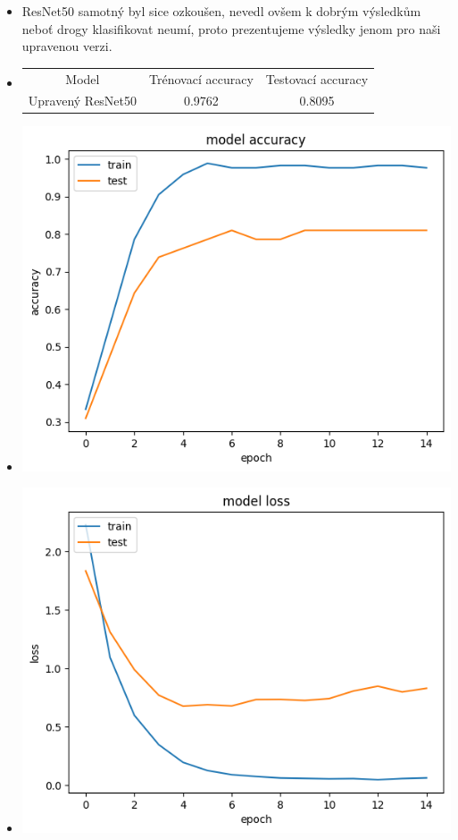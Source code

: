 \documentclass[a4paper]{article}
\newenvironment{ukol}[2][]{\begin{trivlist} 
\item[\hskip \labelsep {\bfseries #1}\hskip \labelsep {\bfseries #2}]}{\end{trivlist}}
\begin{document}
\begin{ukol}{Výsledky}
\begin{itemize}
	\item ResNet50 samotný byl sice ozkoušen, nevedl ovšem k dobrým výsledkům neboť drogy klasifikovat neumí, proto prezentujeme výsledky jenom pro naši upravenou verzi.
	\item \begin{center}
		\begin{tabular}{ c c c }
		 Model & Trénovací accuracy & Testovací accuracy \\ 
		 Upravený ResNet50 & 0.9762 & 0.8095  
		\end{tabular}
		\end{center}
	\item \includegraphics{accuracy}
	\item \includegraphics{loss}
\end{itemize}

\end{ukol}
\end{document}
